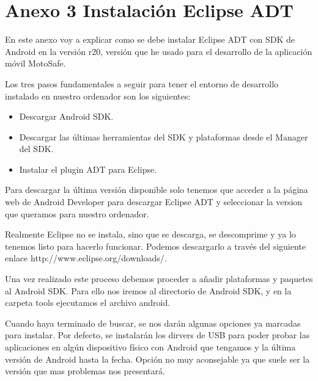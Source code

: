 	\chapter*{Anexo 3 Instalaci\'on Eclipse ADT} %
	
		En este anexo voy a explicar como se debe instalar Eclipse ADT con SDK de Android en la versi\'on r20, versi\'on que he usado para el desarrollo de la aplicaci\'on m\'ovil MotoSafe.
		
		Los tres pasos fundamentales a seguir para tener el entorno de desarrollo instalado en nuestro ordenador son los siguientes:
		
		\begin{itemize}	
			
			\item Descargar Android SDK.
			
			\item Descargar las \'ultimas herramientas del SDK y plataformas desde el Manager del SDK.
			
			\item Instalar el plugin ADT para Eclipse.
			
		\end{itemize}
		
		Para descargar la \'ultima versi\'on disponible solo tenemos que acceder a la p\'agina web de Android Developer para descargar Eclipse ADT y seleccionar la version que queramos para nuestro ordenador.
		
		Realmente Eclipse no se instala, sino que se descarga, se descomprime y ya lo tenemos listo para hacerlo funcionar. Podemos descargarlo a trav\'es del siguiente enlace http://www.eclipse.org/downloads/.
		
		Una vez realizado este proceso debemos proceder a añadir plataformas y paquetes al Android SDK. Para ello nos iremos al directorio de Android SDK, y en la carpeta tools ejecutamos el archivo android.
		
		Cuando haya terminado de buscar, se nos dar\'an algunas opciones ya marcadas para instalar. Por defecto, se instalar\'an los dirvers de USB para poder probar las aplicaciones en alg\'un dispositivo f\'isico con Android que tengamos y la \'ultima versi\'on de Android hasta la fecha. Opci\'on no muy aconsejable ya que suele ser la versi\'on que mas problemas nos presentar\'a.
		
